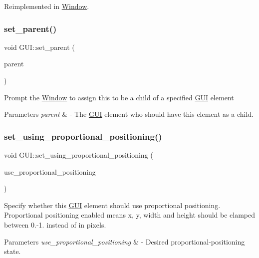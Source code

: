 Reimplemented in \mbox{\hyperlink{class_window_ae70c9e2fddb5224f884291b6d8225fe4}{Window}}.

\mbox{\label{class_g_u_i_a5d14a0bdad4c542b854951d3092bcea2}} 
\subsubsection{\texorpdfstring{set\+\_\+parent()}{set\_parent()}}
{\footnotesize\ttfamily void G\+U\+I\+::set\+\_\+parent (\begin{DoxyParamCaption}\item[{\mbox{\hyperlink{class_g_u_i}{G\+UI}} $\ast$}]{parent }\end{DoxyParamCaption})}

Prompt the \mbox{\hyperlink{class_window}{Window}} to assign this to be a child of a specified \mbox{\hyperlink{class_g_u_i}{G\+UI}} element 
\begin{DoxyParams}{Parameters}
{\em parent} & -\/ The \mbox{\hyperlink{class_g_u_i}{G\+UI}} element who should have this element as a child. \\
\hline
\end{DoxyParams}
\mbox{\label{class_g_u_i_abb013debfa5f24e41990869f6684c228}} 
\subsubsection{\texorpdfstring{set\+\_\+using\+\_\+proportional\+\_\+positioning()}{set\_using\_proportional\_positioning()}}
{\footnotesize\ttfamily void G\+U\+I\+::set\+\_\+using\+\_\+proportional\+\_\+positioning (\begin{DoxyParamCaption}\item[{bool}]{use\+\_\+proportional\+\_\+positioning }\end{DoxyParamCaption})}

Specify whether this \mbox{\hyperlink{class_g_u_i}{G\+UI}} element should use proportional positioning. Proportional positioning enabled means x, y, width and height should be clamped between 0.-\/1. instead of in pixels. 
\begin{DoxyParams}{Parameters}
{\em use\+\_\+proportional\+\_\+positioning} & -\/ Desired proportional-\/positioning state. \\
\hline
\end{DoxyParams}
\mbox{\label{class_g_u_i_afca3eaa048f1c0f0d0348b6882480196}} 
